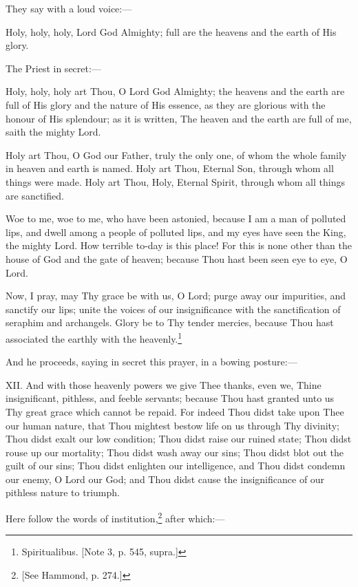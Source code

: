 They say with a loud voice:—

Holy, holy, holy, Lord God Almighty; full are the heavens and the earth of His glory.

The Priest in secret:—

Holy, holy, holy art Thou, O Lord God Almighty; the heavens and the earth are full of His glory and the nature of His essence, as they are glorious with the honour of His splendour; as it is written, The heaven and the earth are full of me, saith the mighty Lord.

Holy art Thou, O God our Father, truly the only one, of whom the whole family in heaven and earth is named. Holy art Thou, Eternal Son, through whom all things were made. Holy art Thou, Holy, Eternal Spirit, through whom all things are sanctified.

Woe to me, woe to me, who have been astonied, because I am a man of polluted lips, and dwell among a people of polluted lips, and my eyes have seen the King, the mighty Lord. How terrible to-day is this place! For this is none other than the house of God and the gate of heaven; because Thou hast been seen eye to eye, O Lord.

Now, I pray, may Thy grace be with us, O Lord; purge away our impurities, and sanctify our lips; unite the voices of our insignificance with the sanctification of seraphim and archangels. Glory be to Thy tender mercies, because Thou hast associated the earthly with the heavenly.\footnote{\par  Spiritualibus. [Note 3, p. 545, supra.]}

And he proceeds, saying in secret this prayer, in a bowing posture:—

XII. And with those heavenly powers we give Thee thanks, even we, Thine insignificant, pithless, and feeble servants; because Thou hast granted unto us Thy great grace which cannot be repaid. For indeed Thou didst take upon Thee our human nature, that Thou mightest bestow life on us through Thy divinity; Thou didst exalt our low condition; Thou didst raise our ruined state; Thou didst rouse up our mortality; Thou didst wash away our sins; Thou didst blot out the guilt of our sins; Thou didst enlighten our intelligence, and Thou didst condemn our enemy, O Lord our God; and Thou didst cause the insignificance of our pithless nature to triumph.

Here follow the words of institution,\footnote{\par{}  [See Hammond, p. 274.]} after which:—

